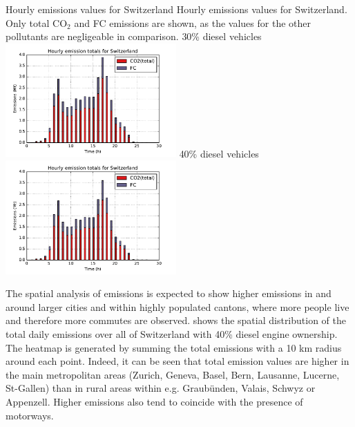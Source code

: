 \createfigure%
{Hourly emissions values for Switzerland}%
{Hourly emissions values for Switzerland. Only total CO$_2$ and FC emissions are shown, as the values for the other pollutants are negligeable in comparison.}%
{\label{fig:hourlyEmissions}}%
{%
  \createsubfigure%
  {30\% diesel vehicles}%
  {\includegraphics[width=0.49\textwidth,
angle=0]{figures/hourly_emissions_30pct_diesel.pdf}}%
  {\label{fig:hourlyEmissions-30pctDiesel}}%
  {}%
  \createsubfigure%
  {40\% diesel vehicles}%
  {\includegraphics[width=0.49\textwidth,
angle=0]{figures/hourly_emissions_40pct_diesel.pdf}}%
  {}%
}%
{}

The spatial analysis of emissions is expected to show higher emissions in and around larger cities and within highly populated cantons, where more people live and therefore more commutes are observed.
 shows the spatial distribution of the total daily emissions over all of Switzerland with 40\% diesel engine ownership.
The heatmap is generated by summing the total emissions with a 10 km radius around each point.
Indeed, it can be seen that total emission values are higher in the main metropolitan areas (Zurich, Geneva, Basel, Bern, Lausanne, Lucerne, St-Gallen) than in rural areas within e.g. Graub\"unden, Valais, Schwyz or Appenzell.
Higher emissions also tend to coincide with the presence of motorways.

